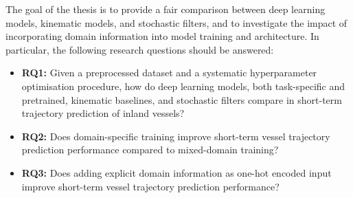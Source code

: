     The goal of the thesis is to provide a fair comparison between deep learning models, kinematic models, and stochastic filters, and to investigate the impact of incorporating domain information into model training and architecture.
    In particular, the following research questions should be answered: 
    \begin{itemize}
      \item \textbf{RQ1:}
      Given a preprocessed dataset and a systematic hyperparameter optimisation procedure, how do deep learning models, both task-specific and pretrained, kinematic baselines, and stochastic filters compare in short-term trajectory prediction of inland vessels?
    
      \item \textbf{RQ2:} 
    Does domain-specific training improve short-term vessel trajectory prediction performance compared to mixed-domain training?
      \item \textbf{RQ3:} 
     Does adding explicit domain information as one-hot encoded input improve short-term vessel trajectory prediction performance?
    \end{itemize}
